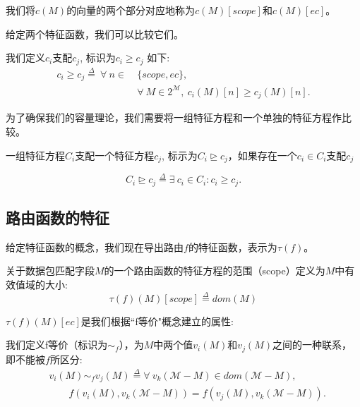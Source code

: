 我们将$c(M)$的向量的两个部分对应地称为$c(M)[scope]$和$c(M)[ec]$。

给定两个特征函数，我们可以比较它们。 

\begin{definition}我们定义$c_i$支配$c_j$, 标识为$c_i \geq c_j$ 如下:
\begin{equation*}
\begin{split}
c_i \geq c_j \overset{\Delta}{=}\ \forall\ n \in\ &\{scope, ec\},\\
&\forall\ M \in 2^\mathcal{M},\ c_i(M)[n] \geq c_j(M)[n].
\end{split}
\end{equation*}
\end{definition}

为了确保我们的容量理论，我们需要将一组特征方程和一个单独的特征方程作比较。


\begin{definition}
一组特征方程$C_i$支配一个特征方程$c_j$, 标示为$C_i \trianglerighteq c_j$，如果存在一个$c_i \in C_i$支配$c_j$

\begin{equation*}
C_i \trianglerighteq c_j \overset{\Delta}{=} \exists\ c_i \in C_i : c_i \geq c_j.
\end{equation*}
\end{definition}
 
\subsection{路由函数的特征} 
给定特征函数的概念，我们现在导出路由$f$的特征函数，表示为$\tau(f)$。

\begin{definition}
\label{def:set-comparator}
关于数据包匹配字段$M$的一个路由函数的特征方程的范围（scope）定义为$M$中有效值域的大小:
\begin{equation*}
\tau(f)(M)[scope] \overset{\Delta}{=} dom(M)
\end{equation*}
\end{definition}

$\tau(f)(M)[ec]$是我们根据``f等价"概念建立的属性: 
\begin{definition} 我们定义f等价（标识为$\sim_f$），为$M$中两个值$v_i(M)$和$v_j(M)$之间的一种联系，即不能被$f$所区分:
\begin{equation*}
\begin{split}
&v_i(M) \sim_f v_j(M) \overset{\Delta}{=} \forall\ v_k(\mathcal{M} - M) \in dom(\mathcal{M} - M),\\
&\qquad f(v_i(M), v_k(\mathcal{M} - M)) = f(v_j(M), v_k(\mathcal{M} - M)). 
\end{split}
\end{equation*}
\end{definition}



